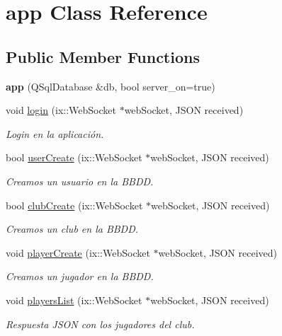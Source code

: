 \hypertarget{classapp}{}\section{app Class Reference}
\label{classapp}
\subsection*{Public Member Functions}
\begin{DoxyCompactItemize}
\item 
\mbox{\label{classapp_ad4bae55c0e3beb4a4c65b9e9d657ab59}} 
{\bfseries app} (Q\+Sql\+Database \&db, bool server\+\_\+on=true)
\item 
void \mbox{\hyperlink{classapp_a0bb96ab42618921392ac30e13444391c}{login}} (ix\+::\+Web\+Socket $\ast$web\+Socket, J\+S\+ON received)
\begin{DoxyCompactList}\small\item\em Login en la aplicación. \end{DoxyCompactList}\item 
bool \mbox{\hyperlink{classapp_a6642515de9db6d78f89d3969553be999}{user\+Create}} (ix\+::\+Web\+Socket $\ast$web\+Socket, J\+S\+ON received)
\begin{DoxyCompactList}\small\item\em Creamos un usuario en la B\+B\+DD. \end{DoxyCompactList}\item 
bool \mbox{\hyperlink{classapp_afb7363d3bc58746f8c71425ba6050db1}{club\+Create}} (ix\+::\+Web\+Socket $\ast$web\+Socket, J\+S\+ON received)
\begin{DoxyCompactList}\small\item\em Creamos un club en la B\+B\+DD. \end{DoxyCompactList}\item 
void \mbox{\hyperlink{classapp_a6f44f304590371aa8aae2a2e7b504a64}{player\+Create}} (ix\+::\+Web\+Socket $\ast$web\+Socket, J\+S\+ON received)
\begin{DoxyCompactList}\small\item\em Creamos un jugador en la B\+B\+DD. \end{DoxyCompactList}\item 
void \mbox{\hyperlink{classapp_aeddfad0a193f1b1c8581d31977ff4c10}{players\+List}} (ix\+::\+Web\+Socket $\ast$web\+Socket, J\+S\+ON received)
\begin{DoxyCompactList}\small\item\em Respuesta J\+S\+ON con los jugadores del club. \end{DoxyCompactList}\item 

\end{DoxyCompactItemize}
